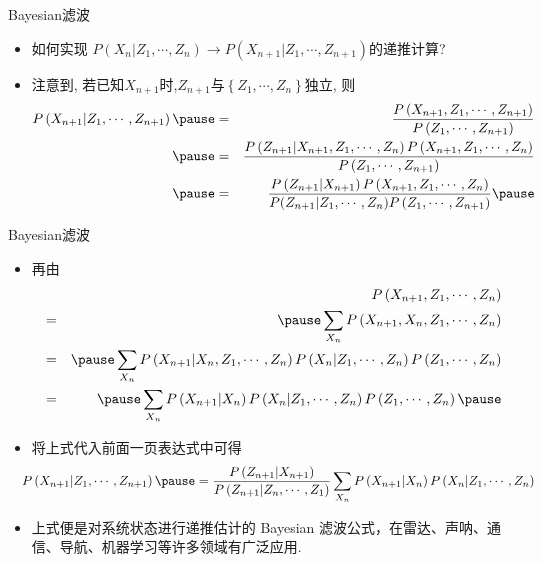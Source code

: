 \begin{frame}{{\rm Bayesian}滤波}
\begin{itemize}[<+-|alert@+>]
	\item 如何实现 $P\left(X_{n} | Z_{1}, \cdots, Z_{n}\right) \longrightarrow P\left(X_{n+1} | Z_{1}, \cdots, Z_{n+1}\right)$的递推计算?
	\item 注意到, 若已知$X_{n+1}$时,$Z_{n+1}$与$\left\{Z_{1}, \cdots, Z_{n}\right\}$独立, 则\pause
	{\small\begin{eqnarray*}
		P\left(X_{n+1} | Z_{1}, \cdots, Z_{n+1}\right)\pause&=& \frac{P\left(X_{n+1}, Z_{1}, \cdots, Z_{n+1}\right)}{P\left(Z_{1}, \cdots, Z_{n+1}\right)}\\
		\pause&=&\frac{P\left(Z_{n+1} | X_{n+1}, Z_{1}, \cdots, Z_{n}\right) P\left(X_{n+1}, Z_{1}, \cdots, Z_{n}\right)}{P\left(Z_{1}, \cdots, Z_{n+1}\right)}\\
		\pause&=&\frac{P\left(Z_{n+1} | X_{n+1}\right) P\left(X_{n+1}, Z_{1}, \cdots, Z_{n}\right)}{P(Z_{n+1}|Z_{1}, \cdots, Z_n)P\left(Z_{1}, \cdots, Z_{n+1}\right)}\pause
	\end{eqnarray*}}




\end{itemize}



\end{frame}

\begin{frame}{{\rm Bayesian}滤波}
	\begin{itemize}[<+-|alert@+>]
		\item 再由\pause
		{\small \begin{eqnarray*}
			&&P\left(X_{n+1}, Z_{1}, \cdots, Z_{n}\right)\\
			&=&\pause\sum_{X_{n}} P\left(X_{n+1}, X_{n}, Z_{1}, \cdots, Z_{n}\right) \\
			&=&\pause\sum_{X_{n}} P\left(X_{n+1} | X_{n}, Z_{1}, \cdots, Z_{n}\right) P\left(X_{n} | Z_{1}, \cdots, Z_{n}\right) P\left(Z_{1}, \cdots, Z_{n}\right) \\
			&=&\pause\sum_{X_{n}} P\left(X_{n+1} | X_{n}\right) P\left(X_{n} | Z_{1}, \cdots, Z_{n}\right) P\left(Z_{1}, \cdots, Z_{n}\right)\pause
		\end{eqnarray*}}
	    \item 将上式代入前面一页表达式中可得
	{\small \[
		\hspace{-0.3cm} P\left(X_{n+1} | Z_{1}, \cdots, Z_{n+1}\right)\pause=\frac{P\left(Z_{n+1} | X_{n+1}\right)}{P\left(Z_{n+1} | Z_{n}, \cdots, Z_{1}\right)} \sum_{X_{n}} P\left(X_{n+1} | X_{n}\right) P\left(X_{n} | Z_{1}, \cdots, Z_{n}\right)\]}
		\item 上式便是对系统状态进行递推估计的 Bayesian 滤波公式，在雷达、声呐、通信、导航、机器学习等许多领域有广泛应用.

	\end{itemize}






	\end{frame}
